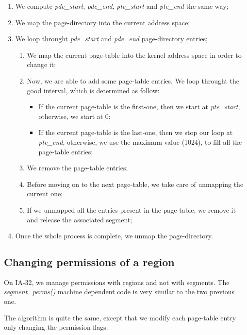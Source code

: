 \begin{enumerate}
\item
  We compute \textit{pde\_start}, \textit{pde\_end},
  \textit{pte\_start} and \textit{pte\_end} the same way;
\item
  We map the page-directory into the current address space;
\item
  We loop throught \textit{pde\_start} and \textit{pde\_end}
  page-directory entries;
  \begin{enumerate}
  \item
    We map the current page-table into the kernel address space in
    order to change it;
  \item
    Now, we are able to add some page-table entries. We loop throught
    the good interval, which is determined as follow:
    \begin{itemize}
    \item
      If the current page-table is the first-one, then we start at
      \textit{pte\_start}, otherwise, we start at 0;
    \item
      If the current page-table is the last-one, then we stop our loop
      at \textit{pte\_end}, otherwise, we use the maximum value
      (1024), to fill all the page-table entries;
    \end{itemize}
    \item
      We remove the page-table entries;
    \item
      Before moving on to the next page-table, we take care of
      unmapping the current one;
    \item
      If we unmapped all the entries present in the page-table, we
      remove it and release the associated segment;
  \end{enumerate}
\item
  Once the whole process is complete, we unmap the page-directory.
\end{enumerate}

%
%

\subsection{Changing permissions of a region}

On IA-32, we manage permissions with regions and not with
segments. The \textit{segment\_perms()} machine dependent code is very
similar to the two previous one.

The algorithm is quite the same, except that we modify each page-table
entry only changing the permission flags.

